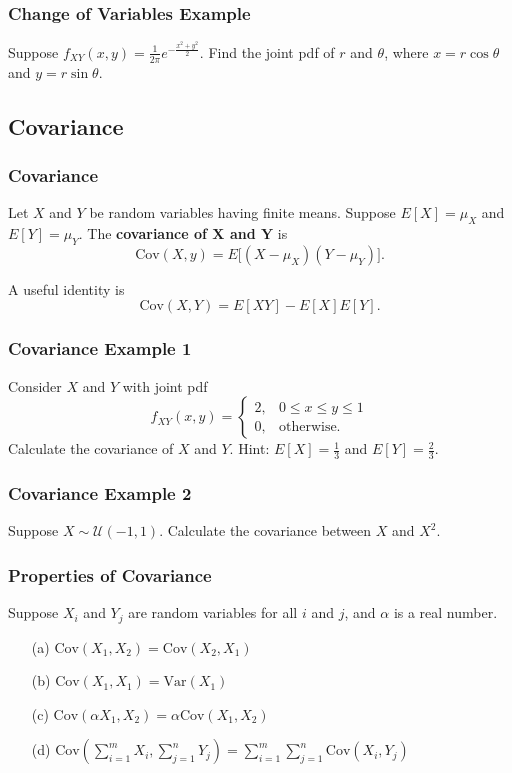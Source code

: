\documentclass{beamer}
\begin{document}
\begin{frame}[t]
\frametitle{Change of Variables Example}
\begin{Example}
Suppose $f_{XY}(x, y) = \frac{1}{2\pi} e^{-\frac{x^2 + y^2}{2}}$. Find the joint pdf of $r$ and $\theta$, where $x = r\cos\theta$ and $y=r\sin\theta$.
\end{Example}
\end{frame}

\subsection{Covariance}
\begin{frame}
\frametitle{Covariance}
\begin{Definition}
Let $X$ and $Y$ be random variables having finite means. Suppose $E[X] = \mu_X$ and $E[Y] = \mu_Y$. The {\bf covariance of $\boldsymbol X$ and $\boldsymbol Y$} is
$$
\text{Cov}(X, y) = E\Big[(X - \mu_X)(Y - \mu_Y)\Big].
$$
\end{Definition}
A useful identity is
$$
\text{Cov}(X, Y) = E[XY] - E[X]E[Y].
$$
\end{frame}

\begin{frame}[t]
\frametitle{Covariance Example 1}
\tiny
\begin{Example}
Consider $X$ and $Y$ with joint pdf
$$
f_{XY}(x, y) = \begin{cases} 2, &	0\leq x \leq y\leq 1\\ 0,	&	\text{otherwise.}\end{cases}
$$
Calculate the covariance of $X$ and $Y$. Hint: $E[X] = \frac{1}{3}$ and  $E[Y] =  \frac{2}{3}.$
\end{Example}

\end{frame}

\begin{frame}[t]
\frametitle{Covariance Example 2}
\begin{Example}
Suppose $X\sim{\mathcal{U}(-1, 1)}$. Calculate the covariance between $X$ and $X^2$.
\end{Example}

\end{frame}


\begin{frame}
\frametitle{Properties of Covariance}
Suppose $X_i$ and $Y_j$ are random variables for all $i$ and $j$, and $\alpha$ is a real number.
\begin{enumerate}
\item[(a)] $\text{Cov}(X_1, X_2) = \text{Cov}(X_2, X_1)$
\item[(b)] $\text{Cov}(X_1, X_1) = \text{Var}(X_1)$
\item[(c)] $\text{Cov}(\alpha X_1, X_2) = \alpha \text{Cov}(X_1, X_2)$
\item[(d)] $\displaystyle \text{Cov}\left(\sum_{i = 1}^m X_i, \sum_{j = 1}^n Y_j\right) = \sum_{i = 1}^m\sum_{j = 1}^n \text{Cov}(X_i, Y_j)$
\end{enumerate}

\end{frame}
\end{document}
